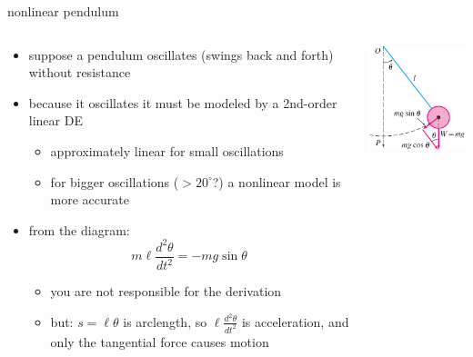 \documentclass[dvipsnames,colorlinks]{beamer}
\begin{document}
\begin{frame}{nonlinear pendulum}

\begin{columns}
\begin{column}{0.7\textwidth}
\begin{itemize}
\item suppose a pendulum oscillates (swings back and forth) without resistance
\item because it oscillates it must be modeled by a 2nd-order linear DE
     \begin{itemize}
     \item approximately linear for small oscillations 
     \item for bigger oscillations ($>20^\circ$?) a nonlinear model is more accurate
     \end{itemize}
\item from the diagram:
    $$m \ell \frac{d^2\theta}{dt^2} = - mg \sin\theta$$

\vspace{-2mm}
     \begin{itemize}
     \item you are not responsible for the derivation
     \item but: $s=\ell \theta$ is arclength, so $\ell \frac{d^2\theta}{dt^2}$ is acceleration, and only the tangential force causes motion
     \end{itemize}
\end{itemize}
\end{column}
\begin{column}{0.3\textwidth}
\includegraphics[width=\textwidth]{figs/pendulum}
\end{column}
\end{columns}
\end{frame}
\end{document}
